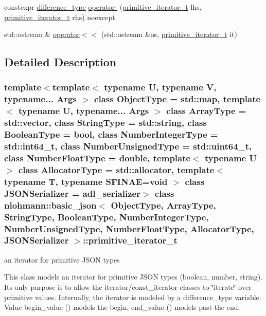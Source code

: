 \begin{DoxyCompactItemize}
\item 
constexpr \hyperlink{classnlohmann_1_1basic__json_afe7c1303357e19cea9527af4e9a31d8f}{difference\+\_\+type} \hyperlink{classnlohmann_1_1basic__json_1_1primitive__iterator__t_ac6d902d6ec9a02dabed5452d3ae78f7e}{operator-\/} (\hyperlink{classnlohmann_1_1basic__json_1_1primitive__iterator__t}{primitive\+\_\+iterator\+\_\+t} lhs, \hyperlink{classnlohmann_1_1basic__json_1_1primitive__iterator__t}{primitive\+\_\+iterator\+\_\+t} rhs) noexcept
\item 
std\+::ostream \& \hyperlink{classnlohmann_1_1basic__json_1_1primitive__iterator__t_a653e8be3b4fb047e8b4460cd932f2b52}{operator$<$$<$} (std\+::ostream \&os, \hyperlink{classnlohmann_1_1basic__json_1_1primitive__iterator__t}{primitive\+\_\+iterator\+\_\+t} it)
\end{DoxyCompactItemize}


\subsection{Detailed Description}
\subsubsection*{template$<$template$<$ typename U, typename V, typename... Args $>$ class Object\+Type = std\+::map, template$<$ typename U, typename... Args $>$ class Array\+Type = std\+::vector, class String\+Type = std\+::string, class Boolean\+Type = bool, class Number\+Integer\+Type = std\+::int64\+\_\+t, class Number\+Unsigned\+Type = std\+::uint64\+\_\+t, class Number\+Float\+Type = double, template$<$ typename U $>$ class Allocator\+Type = std\+::allocator, template$<$ typename T, typename S\+F\+I\+N\+A\+E=void $>$ class J\+S\+O\+N\+Serializer = adl\+\_\+serializer$>$\newline
class nlohmann\+::basic\+\_\+json$<$ Object\+Type, Array\+Type, String\+Type, Boolean\+Type, Number\+Integer\+Type, Number\+Unsigned\+Type, Number\+Float\+Type, Allocator\+Type, J\+S\+O\+N\+Serializer $>$\+::primitive\+\_\+iterator\+\_\+t}

an iterator for primitive J\+S\+ON types 

This class models an iterator for primitive J\+S\+ON types (boolean, number, string). It\textquotesingle{}s only purpose is to allow the iterator/const\+\_\+iterator classes to \char`\"{}iterate\char`\"{} over primitive values. Internally, the iterator is modeled by a {\ttfamily difference\+\_\+type} variable. Value begin\+\_\+value ({}) models the begin, end\+\_\+value ({}) models past the end. 

